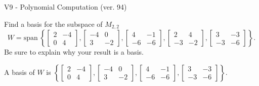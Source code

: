 \begin{exercise}
  \begin{exerciseTitle}V9 - Polynomial Computation (ver. 94)\end{exerciseTitle}
  \begin{exerciseStatement}
    Find a basis for the subspace of \(M_{2,2}\) 
\[W=\mathrm{span}\ \left\{\left[\begin{array}{cc}
2 & -4 \\
0 & 4
\end{array}\right] , \left[\begin{array}{cc}
-4 & 0 \\
3 & -2
\end{array}\right] , \left[\begin{array}{cc}
4 & -1 \\
-6 & -6
\end{array}\right] , \left[\begin{array}{cc}
2 & 4 \\
-3 & -2
\end{array}\right] , \left[\begin{array}{cc}
3 & -3 \\
-3 & -6
\end{array}\right]\right\}.\]
 Be sure to explain why your result is a basis.


  \end{exerciseStatement}
  \begin{exerciseAnswer}
   A basis of \(W\) is  \(\left\{\left[\begin{array}{cc}
2 & -4 \\
0 & 4
\end{array}\right] , \left[\begin{array}{cc}
-4 & 0 \\
3 & -2
\end{array}\right] , \left[\begin{array}{cc}
4 & -1 \\
-6 & -6
\end{array}\right] , \left[\begin{array}{cc}
3 & -3 \\
-3 & -6
\end{array}\right]\right\}\).
  


  \end{exerciseAnswer}
\end{exercise}